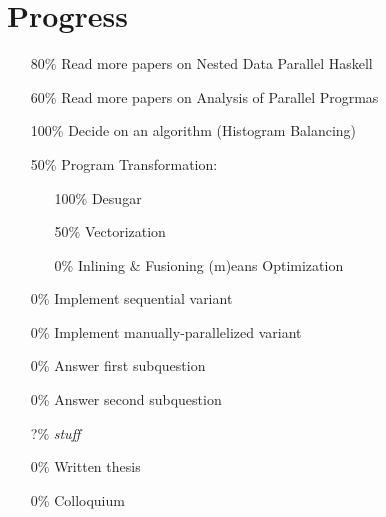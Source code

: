 \documentclass{article}
\newcommand{\note}[1]{{\tiny (#1)}}
\begin{document}
  \section{Progress}
    \begin{itemize}
      \item[80\%] Read more papers on Nested Data Parallel Haskell
      \item[60\%] Read more papers on Analysis of Parallel Progrmas
      \item[100\%] Decide on an algorithm (Histogram Balancing)
      \item[50\%] Program Transformation:
        \begin{itemize}
          \item[100\%] Desugar
          \item[50\%] Vectorization
          \item[0\%] Inlining \& Fusioning \note means Optimization
        \end{itemize}
      \item[0\%] Implement sequential variant
      \item[0\%] Implement manually-parallelized variant
      \item[0\%] Answer first subquestion
      \item[0\%] Answer second subquestion
      \item[?\%] \textit{stuff}
      \item[0\%] Written thesis
      \item[0\%] Colloquium
    \end{itemize}
    
\end{document}
